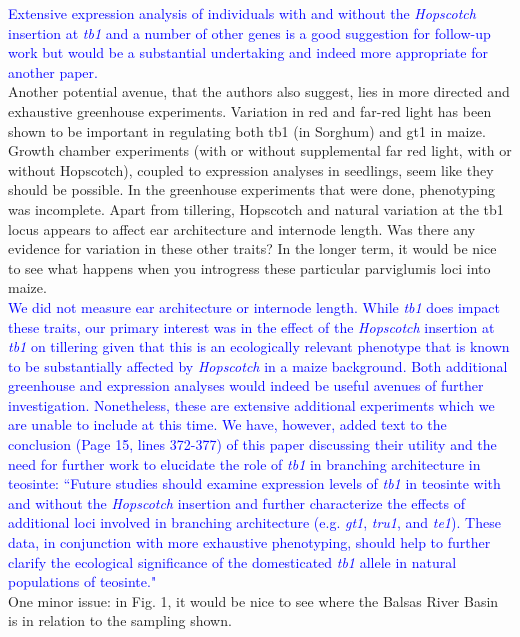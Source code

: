 \documentclass[11pt]{article}
\newcommand{\res}[1]{\noindent \textcolor{blue}{{#1}} \\}
\begin{document}
\res{Extensive expression analysis of individuals with and without the \emph{Hopscotch} insertion at \emph{tb1} and a number of other genes is a good suggestion for follow-up work but would be a substantial undertaking and indeed more appropriate for another paper. }

Another potential avenue, that the authors also suggest, lies in more directed and exhaustive greenhouse experiments. Variation in red and far-red light has been shown to be important in regulating both tb1 (in Sorghum) and gt1 in maize. Growth chamber experiments (with or without supplemental far red light, with or without Hopscotch), coupled to expression analyses in seedlings, seem like they should be possible.  In the greenhouse experiments that were done, phenotyping was incomplete. Apart from tillering, Hopscotch and natural variation at the tb1 locus appears to affect ear architecture and internode length. Was there any evidence for variation in these other traits? In the longer term, it would be nice to see what happens when you introgress these particular parviglumis loci into maize.\\ 

\res{We did not measure ear architecture or internode length. 
While \emph{tb1} does impact these traits, our primary interest was in the effect of the \emph{Hopscotch} insertion at \emph{tb1} on tillering given that this is an ecologically relevant phenotype that is known to be substantially affected by \emph{Hopscotch} in a maize background.
Both additional greenhouse and expression analyses would indeed be useful avenues of further investigation.
Nonetheless, these are extensive additional experiments which we are unable to include at this time. 
We have, however, added text to the conclusion (Page 15, lines 372-377) of this paper discussing their utility and the need for further work to elucidate the role of \emph{tb1} in branching architecture in teosinte:
``Future studies should examine expression levels of \emph{tb1} in teosinte with and without the \emph{Hopscotch} insertion and further characterize the effects of additional loci involved in branching architecture (e.g. \emph{gt1}, \emph{tru1}, and \emph{te1}).  These data, in conjunction with more exhaustive phenotyping, should help to further clarify the ecological significance of the domesticated \emph{tb1} allele in natural populations of teosinte."}

One minor issue: in Fig. 1, it would be nice to see where the Balsas River Basin is in relation to the sampling shown. 
\end{document}
